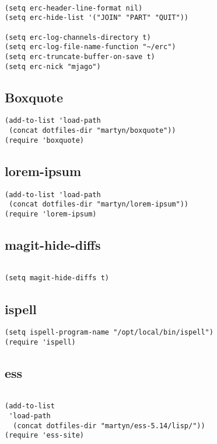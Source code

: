 \documentclass[colorlinks=true,urlcolor=blue,listings-sv]{article}
\begin{document}
\lstset{language=Lisp}
\begin{lstlisting}

(setq erc-header-line-format nil)
(setq erc-hide-list '("JOIN" "PART" "QUIT"))

(setq erc-log-channels-directory t)
(setq erc-log-file-name-function "~/erc")
(setq erc-truncate-buffer-on-save t)
(setq erc-nick "mjago")
\end{lstlisting}
\subsection{Boxquote}
\label{sec-1-52}


\lstset{language=Lisp}
\begin{lstlisting}
(add-to-list 'load-path
 (concat dotfiles-dir "martyn/boxquote"))
(require 'boxquote)
\end{lstlisting}
\subsection{lorem-ipsum}
\label{sec-1-53}


\lstset{language=Lisp}
\begin{lstlisting}
(add-to-list 'load-path
 (concat dotfiles-dir "martyn/lorem-ipsum"))
(require 'lorem-ipsum)
\end{lstlisting}
\subsection{magit-hide-diffs}
\label{sec-1-54}


\lstset{language=Lisp}
\begin{lstlisting}

(setq magit-hide-diffs t)
\end{lstlisting}
\subsection{ispell}
\label{sec-1-55}



\lstset{language=Lisp}
\begin{lstlisting}
(setq ispell-program-name "/opt/local/bin/ispell")
(require 'ispell)
\end{lstlisting}
\subsection{ess}
\label{sec-1-56}


\lstset{language=Lisp}
\begin{lstlisting}

(add-to-list
 'load-path
  (concat dotfiles-dir "martyn/ess-5.14/lisp/"))
(require 'ess-site)
\end{lstlisting}
\end{document}

